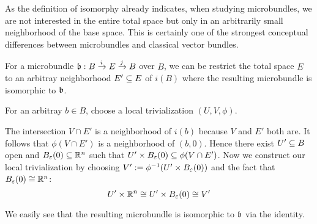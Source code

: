 \begin{myparagraph}
    As the definition of isomorphy already indicates, when studying microbundles,
    we are not interested in the entire total space
    but only in an arbitrarily small neighborhood of the base space.
    This is certainly one of the strongest conceptual differences between microbundles and classical vector bundles.
\end{myparagraph}

\begin{myproposition}\label{microbundle::totalspace}
    For a microbundle $\bundledef{\bb}{B}{E}{i}{j}$ over $B$, we can be restrict the total space $E$ to an arbitray neighborhood $E' \sub E$ of $i(B)$
    where the resulting microbundle is isomorphic to $\bb$.
    \begin{myproof}
        For an arbitray $b \in B$, choose a local trivialization $(U, V, \phi)$.

        The intersection $V \cap E'$ is a neighborhood of $i(b)$ because $V$ and $E'$ both are.
        It follows that $\phi(V \cap E')$ is a neighborhood of $(b, 0)$. Hence there exist $U' \sub B$ open and $\ball[\varepsilon] \sub \R^n$ such that $U' \times \ball[\varepsilon] \sub \phi(V \cap E')$. 
        Now we construct our local trivialization by choosing $V' := \phi^{-1}(U' \times \ball[\varepsilon])$ and the fact that $\ball[\varepsilon] \cong \R^n$:
        \[ U' \times \R^n \cong U' \times \ball[\varepsilon] \cong V' \]

        We easily see that the resulting microbundle is isomorphic to $\bb$ via the identity.
    \end{myproof}
\end{myproposition}